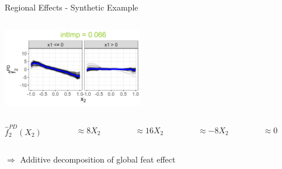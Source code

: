 \documentclass[10pt,compress,t,notes=noshow, xcolor=table]{beamer}
\begin{document}
\begin{frame}{Regional Effects - Synthetic Example}
\begin{columns}[T, totalwidth = \linewidth]
\begin{column}{0.54\textwidth}
{{    \includegraphics[width=0.46\textwidth, trim = 40 0 0 25, clip]{figure/sim1_dt_split2_2.png}
    }

     \begin{columns}[T, totalwidth = \linewidth]
            \begin{column}{0.12\linewidth}
            \centering
             $\hat{f}_2^{PD}(X_2)$ %
         \end{column}
         \begin{column}{0.16\linewidth}
         \centering
             $\approx 8X_2$ %
         \end{column}
        \begin{column}{0.2\linewidth}
\centering
            $\approx 16X_2$ %
         \end{column}
        \begin{column}{0.2\linewidth}
        \centering
            $ \approx -8X_2$ %
         \end{column}        
         \begin{column}{0.2\linewidth}
         \centering
             $\approx 0$%
         \end{column}
     \end{columns}
     \medskip
     $\Rightarrow$ Additive decomposition of global feat effect
}


    \end{column}


\end{columns}
\end{frame}
\end{document}
